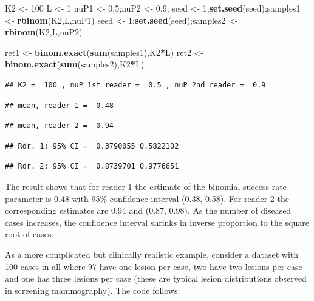 \documentclass[
]{book}
\newenvironment{Shaded}{\begin{snugshade}}{\end{snugshade}}
\newcommand{\DecValTok}[1]{\textcolor[rgb]{0.00,0.00,0.81}{#1}}
\newcommand{\FloatTok}[1]{\textcolor[rgb]{0.00,0.00,0.81}{#1}}
\newcommand{\KeywordTok}[1]{\textcolor[rgb]{0.13,0.29,0.53}{\textbf{#1}}}
\newcommand{\NormalTok}[1]{#1}
\newcommand{\OperatorTok}[1]{\textcolor[rgb]{0.81,0.36,0.00}{\textbf{#1}}}
\newcommand{\StringTok}[1]{\textcolor[rgb]{0.31,0.60,0.02}{#1}}
\begin{document}
\begin{Shaded}
\begin{Highlighting}[]
\NormalTok{K2 <-}\StringTok{ }\DecValTok{100}
\NormalTok{L <-}\StringTok{ }\DecValTok{1}
\NormalTok{nuP1 <-}\StringTok{ }\FloatTok{0.5}\NormalTok{;nuP2 <-}\StringTok{ }\FloatTok{0.9}\NormalTok{;}
\NormalTok{seed <-}\StringTok{ }\DecValTok{1}\NormalTok{;}\KeywordTok{set.seed}\NormalTok{(seed);samples1 <-}\StringTok{ }\KeywordTok{rbinom}\NormalTok{(K2,L,nuP1)}
\NormalTok{seed <-}\StringTok{ }\DecValTok{1}\NormalTok{;}\KeywordTok{set.seed}\NormalTok{(seed);samples2 <-}\StringTok{ }\KeywordTok{rbinom}\NormalTok{(K2,L,nuP2)}

\NormalTok{ret1 <-}\StringTok{ }\KeywordTok{binom.exact}\NormalTok{(}\KeywordTok{sum}\NormalTok{(samples1),K2}\OperatorTok{*}\NormalTok{L)}
\NormalTok{ret2 <-}\StringTok{ }\KeywordTok{binom.exact}\NormalTok{(}\KeywordTok{sum}\NormalTok{(samples2),K2}\OperatorTok{*}\NormalTok{L)}
\end{Highlighting}
\end{Shaded}

\begin{verbatim}
## K2 =  100 , nuP 1st reader =  0.5 , nuP 2nd reader =  0.9
\end{verbatim}

\begin{verbatim}
## mean, reader 1 =  0.48
\end{verbatim}

\begin{verbatim}
## mean, reader 2 =  0.94
\end{verbatim}

\begin{verbatim}
## Rdr. 1: 95% CI =  0.3790055 0.5822102
\end{verbatim}

\begin{verbatim}
## Rdr. 2: 95% CI =  0.8739701 0.9776651
\end{verbatim}

The result shows that for reader 1 the estimate of the binomial success rate parameter is 0.48 with 95\% confidence interval (0.38, 0.58). For reader 2 the corresponding estimates are 0.94 and (0.87, 0.98). As the number of diseased cases increases, the confidence interval shrinks in inverse proportion to the square root of cases.

As a more complicated but clinically realistic example, consider a dataset with 100 cases in all where 97 have one lesion per case, two have two lesions per case and one has three lesions per case (these are typical lesion distributions observed in screening mammography). The code follows:
\end{document}
